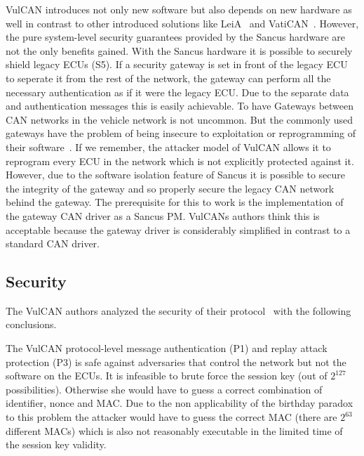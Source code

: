 VulCAN introduces not only new software but also depends on new hardware as well
in contrast to other introduced solutions like LeiA~\cite{Radu2016} and
VatiCAN~\cite{Nurnberger2016}. However, the pure system-level security
guarantees provided by the Sancus hardware are not the only benefits gained.
With the Sancus hardware it is possible to securely shield legacy ECUs (S5). If
a security gateway is set in front of the legacy ECU to seperate it from the
rest of the network, the gateway can perform all the necessary authentication as
if it were the legacy ECU\@. Due to the separate data and authentication
messages this is easily achievable. To have Gateways between CAN networks in the
vehicle network is not uncommon. But the commonly used gateways have the problem
of being insecure to exploitation or reprogramming of their
software~\cite{Checkoway2011}. If we remember, the attacker model of VulCAN
allows it to reprogram every ECU in the network which is not explicitly
protected against it. However, due to the software isolation feature of Sancus
it is possible to secure the integrity of the gateway and so properly secure the
legacy CAN network behind the gateway. The prerequisite for this to work is the
implementation of the gateway CAN driver as a Sancus PM\@. VulCANs authors think
this is acceptable because the gateway driver is considerably simplified in
contrast to a standard CAN driver.

\subsection{Security}

The VulCAN authors analyzed the security of their protocol~\cite{VanBulck2017} with the following conclusions.

\smallskip
The VulCAN protocol-level message authentication (P1) and replay attack
protection (P3) is safe against adversaries that control the network but not the
software on the ECUs. It is infeasible to brute force the session key (out of
$2^{127}$ possibilities). Otherwise she would have to guess a correct
combination of identifier, nonce and MAC\@. Due to the non applicability of the
birthday paradox to this problem the attacker would have to guess the correct
MAC (there are $2^{63}$ different MACs) which is also not reasonably executable
in the limited time of the session key validity. 

